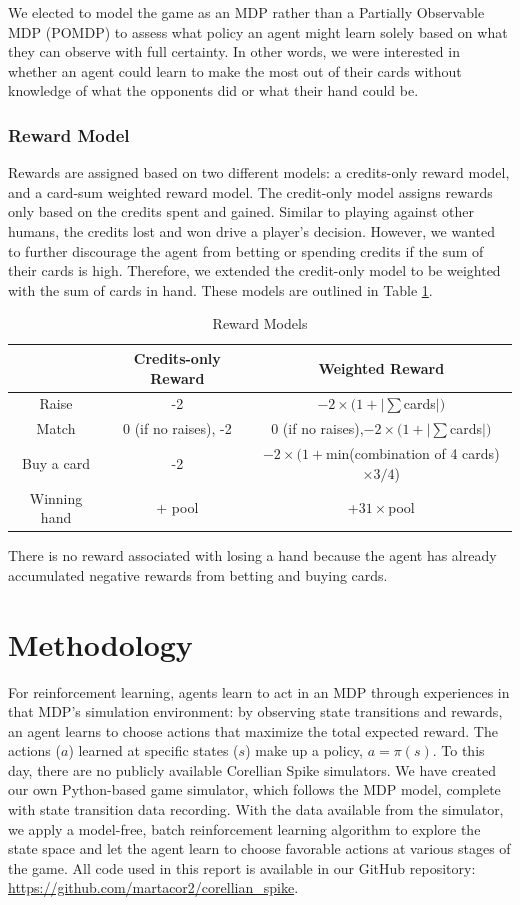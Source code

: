\documentclass{article}
\begin{document}
We elected to model the game as an MDP rather than a Partially Observable MDP (POMDP) to assess what policy an agent might learn solely based on what they can observe with full certainty. In other words, we were interested in whether an agent could learn to make the most out of their cards without knowledge of what the opponents did or what their hand could be. 
\subsubsection{Reward Model}
Rewards are assigned based on two different models: a credits-only reward model, and a card-sum weighted reward model. The credit-only model assigns rewards only based on the credits spent and gained. Similar to playing against other humans, the credits lost and won drive a player's decision. However, we wanted to further discourage the agent from betting or spending credits if the sum of their cards is high. Therefore, we extended the credit-only model to be weighted with the sum of cards in hand. These models are outlined in Table \ref{tab:rewards}.
\begin{table}[H]
\centering
\caption{Reward Models}
\begin{tabular}{c|c|c}
& \textbf{Credits-only Reward} & \textbf{Weighted Reward}\\ \hline
Raise & -2 & $-2\times (1+|\sum$cards$|)$ \\ \hline
Match& 0 (if no raises), -2 & 0 (if no raises),$-2\times (1+|\sum$cards$|)$ \\ \hline
Buy a card   & -2                       & $-2\times (1+$min(combination of 4 cards)$\times3/4$)\\ \hline
Winning hand & + pool         & +$31\times$pool
\end{tabular}
\label{tab:rewards}
\end{table}
There is no reward associated with losing a hand because the agent has already accumulated negative rewards from betting and buying cards.

\section{Methodology}
For reinforcement learning, agents learn to act in an MDP through experiences in that MDP's simulation environment: by observing state transitions and rewards, an agent learns to choose actions that maximize the total expected reward. The actions ($a$) learned at specific states ($s$) make up a policy, $a = \pi(s)$. To this day, there are no publicly available Corellian Spike simulators. We have created our own Python-based game simulator, which follows the MDP model, complete with state transition data recording. With the data available from the simulator, we apply a model-free, batch reinforcement learning algorithm to explore the state space and let the agent learn to choose favorable actions at various stages of the game. All code used in this report is available in our GitHub repository: \href{https://github.com/martacor2/corellian\_spike}{https://github.com/martacor2/corellian\_spike}.
\end{document}
